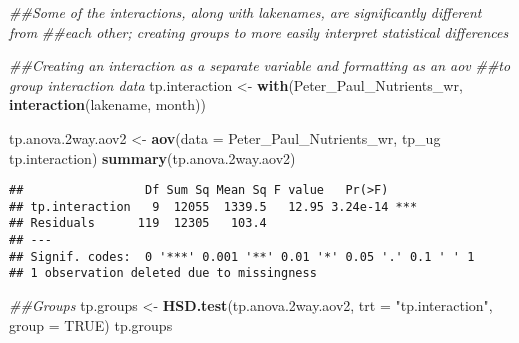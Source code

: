 \documentclass[]{article}
\newenvironment{Shaded}{\begin{snugshade}}{\end{snugshade}}
\newcommand{\CommentTok}[1]{\textcolor[rgb]{0.56,0.35,0.01}{\textit{#1}}}
\newcommand{\DataTypeTok}[1]{\textcolor[rgb]{0.13,0.29,0.53}{#1}}
\newcommand{\FloatTok}[1]{\textcolor[rgb]{0.00,0.00,0.81}{#1}}
\newcommand{\KeywordTok}[1]{\textcolor[rgb]{0.13,0.29,0.53}{\textbf{#1}}}
\newcommand{\NormalTok}[1]{#1}
\newcommand{\OperatorTok}[1]{\textcolor[rgb]{0.81,0.36,0.00}{\textbf{#1}}}
\newcommand{\OtherTok}[1]{\textcolor[rgb]{0.56,0.35,0.01}{#1}}
\newcommand{\StringTok}[1]{\textcolor[rgb]{0.31,0.60,0.02}{#1}}
\begin{document}
\begin{Shaded}
\begin{Highlighting}[]
\CommentTok{##Some of the interactions, along with lakenames, are significantly different from}
\CommentTok{##each other; creating groups to more easily interpret statistical differences}

\CommentTok{##Creating an interaction as a separate variable and formatting as an aov}
\CommentTok{##to group interaction data}
\NormalTok{tp.interaction <-}\StringTok{ }\KeywordTok{with}\NormalTok{(Peter_Paul_Nutrients_wr, }
                       \KeywordTok{interaction}\NormalTok{(lakename, month))}
                       
\NormalTok{tp.anova}\FloatTok{.2}\NormalTok{way.aov2 <-}\StringTok{ }\KeywordTok{aov}\NormalTok{(}\DataTypeTok{data =}\NormalTok{ Peter_Paul_Nutrients_wr, }
\NormalTok{                          tp_ug }\OperatorTok{~}\StringTok{ }\NormalTok{tp.interaction)}
\KeywordTok{summary}\NormalTok{(tp.anova}\FloatTok{.2}\NormalTok{way.aov2)}
\end{Highlighting}
\end{Shaded}

\begin{verbatim}
##                 Df Sum Sq Mean Sq F value   Pr(>F)    
## tp.interaction   9  12055  1339.5   12.95 3.24e-14 ***
## Residuals      119  12305   103.4                     
## ---
## Signif. codes:  0 '***' 0.001 '**' 0.01 '*' 0.05 '.' 0.1 ' ' 1
## 1 observation deleted due to missingness
\end{verbatim}

\begin{Shaded}
\begin{Highlighting}[]
\CommentTok{##Groups}
\NormalTok{tp.groups <-}\StringTok{ }\KeywordTok{HSD.test}\NormalTok{(tp.anova}\FloatTok{.2}\NormalTok{way.aov2, }\DataTypeTok{trt =} \StringTok{"tp.interaction"}\NormalTok{, }
                      \DataTypeTok{group =} \OtherTok{TRUE}\NormalTok{)}
\NormalTok{tp.groups}
\end{Highlighting}
\end{Shaded}
\end{document}
